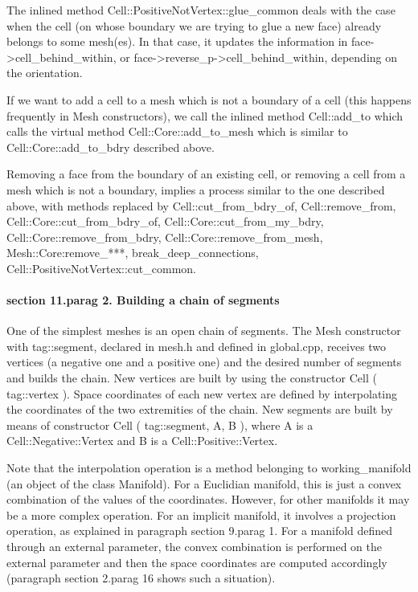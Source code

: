 The inlined method {\codett Cell::PositiveNotVertex::glue\_common} deals with the case when
the cell (on whose boundary we are trying to glue a new face) already belongs to some mesh(es).
In that case, it updates the information in {\codett face->cell\_behind\_within}, or\break
{\codett face->reverse\_p->cell\_behind\_within}, depending on the orientation.

If we want to add a cell to a mesh which is not a boundary of a cell (this happens
frequently in {\codett Mesh} constructors),
we call the inlined method {\codett Cell::add\_to} which calls the virtual method
{\codett Cell::Core::add\_to\_mesh} which is similar to {\codett Cell::Core::add\_to\_bdry}
described above.

Removing a face from the boundary of an existing cell, or removing a cell from a mesh
which is not a boundary, implies a process similar to the one described above,
with methods replaced by {\codett Cell::cut\_from\_bdry\_of}, {\codett Cell::remove\_from},
{\codett Cell::Core::cut\_from\_bdry\_of}, {\codett Cell::Core::cut\_from\_my\_bdry},
{\codett Cell::Core::remove\_from\_bdry}, {\codett Cell::Core::remove\_from\_mesh},
{\codett Mesh::Core:remove\_***}, {\codett break\_deep\_connections},
{\codett Cell::PositiveNotVertex::cut\_common}.
\vfil\eject


\paragraph{\numb section 11.\numb parag 2. Building a chain of segments}

One of the simplest meshes is an open chain of segments.
The {\codett Mesh} constructor with {\codett tag::segment}, declared in {\codett mesh.h}
and defined in
{\codett global.cpp}, receives two vertices (a negative one and a positive one)
and the desired number of segments and builds the chain.
New vertices are built by using the constructor {\codett Cell ( tag::vertex )}.
Space coordinates of each new vertex are defined by interpolating the coordinates of the
two extremities of the chain.
New segments are built by means of constructor {\codett Cell ( tag::segment, A, B )},
where {\codett A} is a {\codett Cell::Negative::Vertex} and {\codett B} is a
{\codett Cell::Positive::Vertex}.

Note that the interpolation operation is a method belonging to {\codett working\_manifold}
(an object of the class {\codett Manifold}).
For a Euclidian manifold, this is just a convex combination of the values of the coordinates.
However, for other manifolds it may be a more complex operation.
For an implicit manifold, it involves a projection operation, as explained in paragraph
\numb section 9.\numb parag 1.
For a manifold defined through an external parameter, the convex combination is performed
on the external parameter and then the space coordinates are computed accordingly
(paragraph \numb section 2.\numb parag 16 shows such a situation).


